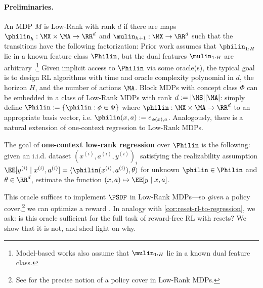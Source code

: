 \paragraph{Preliminaries.} An MDP $M$ is Low-Rank with rank $d$ if there are maps $\philin_h:\MX\times\MA\to\RR^d$ and $\mulin_{h+1}:\MX\to\RR^d$ such that the transitions have the following factorization:
\arxiv{\[\BP_{h+1}(x_{h+1}\mid{}x_h,a_h) = \langle \philin_h(x_h,a_h), \mulin_{h+1}(x_{h+1})\rangle.\]}
Prior  work assumes that $\philin_{1:H}$ lie in a known feature class $\Philin$, but the dual features $\mulin_{1:H}$ are arbitrary \citep{modi2021model,mhammedi2023efficient}.\footnote{Model-based works \citep{agarwal2020flambe,uehara2022representation} also assume that $\mulin_{1:H}$ lie in a known dual feature class.\loose} Given implicit access to $\Philin$ via some oracle(s), the typical goal is to design RL algorithms with time and oracle complexity polynomial in $d$, the horizon $H$, and the number of actions $\MA$.\arxiv{
 } Block MDPs with concept class $\Phi$ can be embedded in a class of Low-Rank MDPs with rank $d := |\MS||\MA|$: simply define $\Philin := \{\philin: \phi\in\Phi\}$ where $\philin:\MX\times\MA\to\RR^d$  to an appropriate basis vector, i.e. $\philin(x,a) := e_{\phi(x),a}$. Analogously, there is a natural extension of one-context regression to Low-Rank MDPs.\loose
\begin{definition}[Informal]\label{Def:low-rank-reg}
The goal of \textbf{one-context low-rank regression} over $\Philin$ is the following: given an i.i.d. dataset $(x^{(i)},a^{(i)},y^{(i)})_i$ satisfying the realizability assumption $\EE[y^{(i)}\mid{}x^{(i)},a^{(i)}] = \langle \philin(x^{(i)},a^{(i)}), \theta\rangle$ for unknown $\philin\in\Philin$ and $\theta\in\RR^d$,
estimate the function $(x,a) \mapsto \EE[y\mid{}x,a]$.
\end{definition}
This oracle suffices to implement $\PSDP$ in Low-Rank MDPs---so \emph{given} a policy cover,\footnote{See \cite{mhammedi2023efficient} for the precise notion of a policy cover in Low-Rank MDPs.} we can optimize a reward \citep{mhammedi2023efficient}. In analogy with \cref{cor:reset-rl-to-regression}, we ask: is this oracle sufficient for the full task of reward-free RL with resets? We show that it is not, and shed light on why.\loose


